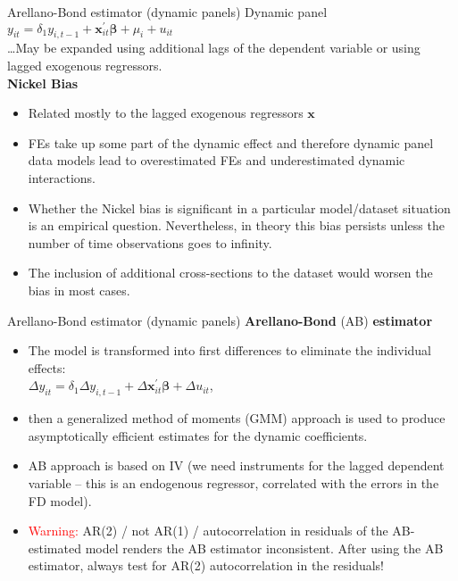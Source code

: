 \documentclass{beamer}
\begin{document}
\begin{frame}{Arellano-Bond estimator (dynamic panels)}
Dynamic panel\\
\medskip
$y_{it} = \delta_1 y_{i,t-1} + \bm{x}^{\prime}_{it} \bm{\beta} + \mu_i + u_{it}$\\
\medskip
\dots May be expanded using additional lags of the dependent variable or using lagged exogenous regressors.\\
\medskip
\small
\textbf{Nickel Bias}
\begin{itemize}
\item Related mostly to the lagged exogenous regressors $\bm{x}$
\item FEs take up some part of the dynamic effect and therefore dynamic panel data models lead to overestimated FEs and underestimated dynamic interactions. 
\item Whether the Nickel bias is significant in a particular model/dataset situation is an empirical question. Nevertheless, in theory this bias persists unless the number of time observations goes to infinity.
\item The inclusion of additional cross-sections to the dataset would worsen the bias in most cases.
\end{itemize}
\end{frame}
\begin{frame}{Arellano-Bond estimator (dynamic panels)}
\textbf{Arellano-Bond} (AB) \textbf{estimator} 
\begin{itemize}
\item The model is transformed into first differences to eliminate the individual effects:\\
$\Delta y_{it} = \delta_1 \Delta y_{i,t-1} + \Delta \bm{x}^{\prime}_{it} \bm{\beta} + \Delta u_{it}$, 
\item then a generalized method of moments (GMM) approach is used to produce asymptotically efficient estimates for the dynamic coefficients.
\item AB approach is based on IV (we need instruments for the lagged dependent variable – this is an endogenous regressor, correlated with the errors in the FD model).
\item \textcolor{red}{Warning:} AR(2) / not AR(1) / autocorrelation in residuals of the AB-estimated model renders the AB estimator inconsistent. After using the AB estimator, always test for AR(2) autocorrelation in the residuals!
\end{itemize}
\end{frame}
\end{document}
